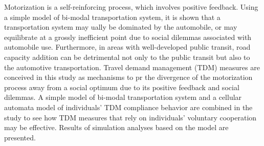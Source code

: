 Motorization is a self-reinforcing process, which involves positive feedback. Using a simple model of bi-modal transportation system, it is shown that a transportation system may ually be dominated by the automobile, or may equilibrate at a grossly inefficient point due to social dilemmas associated with automobile use. Furthermore, in areas with well-developed public transit, road capacity addition can be detrimental not only to the public transit but also to the automotive transportation. Travel demand management (TDM) measures are conceived in this study as mechanisms to pr the divergence of the motorization process away from a social optimum due to its positive feedback and social dilemmas. A simple model of bi-modal transportation system and a cellular automata model of individuals’ TDM compliance behavior are combined in the study to see how TDM measures that rely on individuals’ voluntary cooperation may be effective. Results of simulation analyses based on the model are presented.
